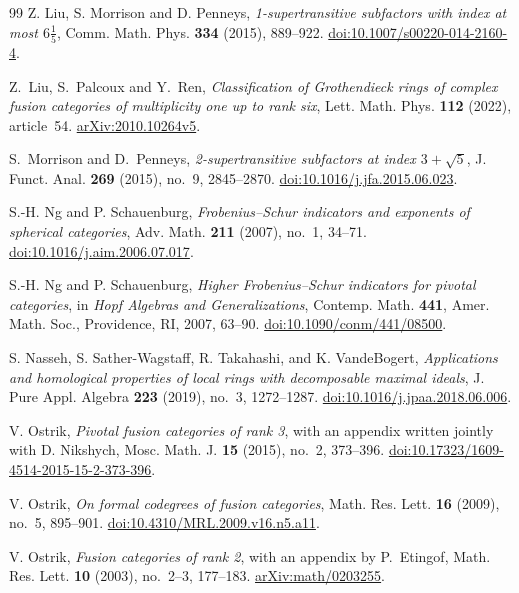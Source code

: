 \documentclass[11pt,a4paper]{article}
\theoremstyle{definition}\newtheorem{definition}[theorem]{Definition}
\theoremstyle{remark}\newtheorem{remark}[theorem]{Remark}
\numberwithin{equation}{section}
\begin{document}
\begin{thebibliography}{99}
Z. Liu, S. Morrison and D. Penneys,
\emph{1-supertransitive subfactors with index at most $6\frac15$},
Comm. Math. Phys. \textbf{334} (2015), 889--922.
\href{https://doi.org/10.1007/s00220-014-2160-4}{doi:10.1007/s00220-014-2160-4}.

Z.~Liu, S.~Palcoux and Y.~Ren,
\emph{Classification of Grothendieck rings of complex fusion categories
of multiplicity one up to rank six},
Lett. Math. Phys. \textbf{112} (2022), article~54.
\href{https://arxiv.org/abs/2010.10264v5}{arXiv:2010.10264v5}.

S.~Morrison and D.~Penneys,
\emph{2-supertransitive subfactors at index $3+\sqrt5$},
J. Funct. Anal. \textbf{269} (2015), no.~9, 2845--2870.
\href{https://doi.org/10.1016/j.jfa.2015.06.023}{doi:10.1016/j.jfa.2015.06.023}.

S.-H. Ng and P. Schauenburg, \emph{Frobenius--Schur indicators and exponents of spherical categories},
Adv. Math. \textbf{211} (2007), no.~1, 34--71.
\href{https://doi.org/10.1016/j.aim.2006.07.017}{doi:10.1016/j.aim.2006.07.017}.

S.-H. Ng and P. Schauenburg, \emph{Higher Frobenius--Schur indicators for
pivotal categories}, in \emph{Hopf Algebras and Generalizations},
Contemp. Math. \textbf{441}, Amer. Math. Soc., Providence, RI, 2007, 63--90.
\href{https://doi.org/10.1090/conm/441/08500}{doi:10.1090/conm/441/08500}.

S. Nasseh, S. Sather-Wagstaff, R. Takahashi, and K. VandeBogert,
\emph{Applications and homological properties of local rings with
decomposable maximal ideals}, J. Pure Appl. Algebra \textbf{223} (2019),
no.~3, 1272--1287.
\href{https://doi.org/10.1016/j.jpaa.2018.06.006}{doi:10.1016/j.jpaa.2018.06.006}.

V. Ostrik, \emph{Pivotal fusion categories of rank 3}, with an appendix
written jointly with D. Nikshych, Mosc. Math. J. \textbf{15} (2015),
no.~2, 373--396.
\href{https://doi.org/10.17323/1609-4514-2015-15-2-373-396}{doi:10.17323/1609-4514-2015-15-2-373-396}.

V. Ostrik, \emph{On formal codegrees of fusion categories},
Math. Res. Lett. \textbf{16} (2009), no.~5, 895--901.
\href{https://doi.org/10.4310/MRL.2009.v16.n5.a11}{doi:10.4310/MRL.2009.v16.n5.a11}.

V. Ostrik, \emph{Fusion categories of rank 2}, with an appendix by P.~Etingof,
Math. Res. Lett. \textbf{10} (2003), no.~2--3, 177--183.
\href{https://arxiv.org/abs/math/0203255}{arXiv:math/0203255}.\par


\end{thebibliography}
\end{document}
